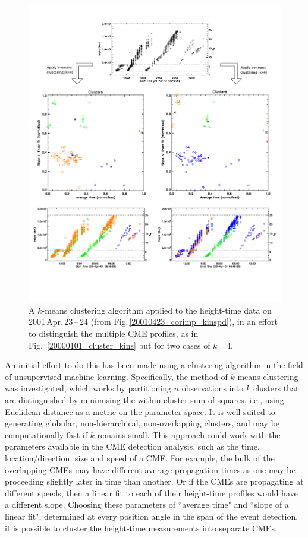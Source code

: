 \documentclass[referee,a4paper,12pt,traditabstract]{swsc}
\begin{document}
\begin{linenumbers}
\begin{figure}[t]
\centerline{\includegraphics[scale=0.578, trim=0 95 0 50, clip=true]{images/20010423_cluster_kins_input.pdf}}
\caption{A $k$-means clustering algorithm applied to the height-time data on 2001\,Apr.\,23\,--\,24 (from Fig.\,\ref{20010423_corimp_kinspd}), in an effort to distinguish the multiple CME profiles, as in Fig.~\ref{20000101_cluster_kins} but for two cases of $k$\,=\,4.
}
\label{20010423_cluster_kins}
\end{figure}


An initial effort to do this has been made using a clustering algorithm in the field of unsupervised machine learning. Specifically, the method of $k$-means clustering was investigated, which works by partitioning $n$ observations into $k$ clusters that are distinguished by minimising the within-cluster sum of squares, i.e., using Euclidean distance as a metric on the parameter space. It is well suited to generating globular, non-hierarchical, non-overlapping clusters, and may be computationally fast if $k$ remains small. This approach could work with the parameters available in the CME detection analysis, such as the time, location/direction, size and speed of a CME. For example, the bulk of the overlapping CMEs may have different average propagation times as one may be proceeding slightly later in time than another. Or if the CMEs are propagating at different speeds, then a linear fit to each of their height-time profiles would have a different slope. Choosing these parameters of ``average time" and ``slope of a linear fit", determined at every position angle in the span of the event detection, it is possible to cluster the height-time measurements into separate CMEs.


\end{linenumbers}
\end{document}
